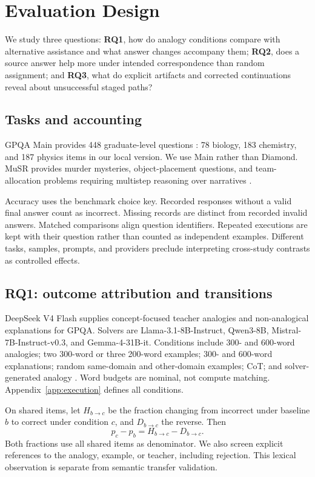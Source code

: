 \section{Evaluation Design}
\label{sec:method}
We study three questions: \textbf{RQ1}, how do analogy conditions compare with alternative assistance and what answer changes accompany them; \textbf{RQ2}, does a source answer help more under intended correspondence than random assignment; and \textbf{RQ3}, what do explicit artifacts and corrected continuations reveal about unsuccessful staged paths?

\subsection{Tasks and accounting}
GPQA Main provides 448 graduate-level questions \citep{rein2023gpqa}: 78 biology, 183 chemistry, and 187 physics items in our local version. We use Main rather than Diamond. MuSR provides murder mysteries, object-placement questions, and team-allocation problems requiring multistep reasoning over narratives \citep{sprague2024musr}.

Accuracy uses the benchmark choice key. Recorded responses without a valid final answer count as incorrect. Missing records are distinct from recorded invalid answers. Matched comparisons align question identifiers. Repeated executions are kept with their question rather than counted as independent examples. Different tasks, samples, prompts, and providers preclude interpreting cross-study contrasts as controlled effects.

\subsection{RQ1: outcome attribution and transitions}
DeepSeek V4 Flash supplies concept-focused teacher analogies and non-analogical explanations for GPQA. Solvers are Llama-3.1-8B-Instruct, Qwen3-8B, Mistral-7B-Instruct-v0.3, and Gemma-4-31B-it. Conditions include 300- and 600-word analogies; two 300-word or three 200-word examples; 300- and 600-word explanations; random same-domain and other-domain examples; CoT; and solver-generated analogy \citep{wei2022cot,kojima2022zero}. Word budgets are nominal, not compute matching. Appendix~\ref{app:execution} defines all conditions.

On shared items, let $H_{b\rightarrow c}$ be the fraction changing from incorrect under baseline $b$ to correct under condition $c$, and $D_{b\rightarrow c}$ the reverse. Then
\begin{equation}
p_c-p_b=H_{b\rightarrow c}-D_{b\rightarrow c}.
\label{eq:help-harm}
\end{equation}
Both fractions use all shared items as denominator. We also screen explicit references to the analogy, example, or teacher, including rejection. This lexical observation is separate from semantic transfer validation.

